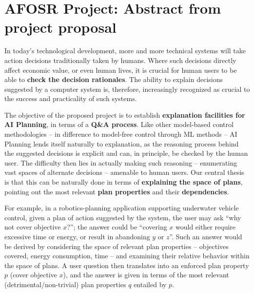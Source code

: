 
\section{AFOSR Project: Abstract from project proposal}
\label{sec:afosr-abstractr}

In today's technological development, more and more technical systems
will take action decisions traditionally taken by humans. Where such
decisions directly affect economic value, or even human lives, it is
crucial for human users to be able to \textbf{check the decision
  rationales}. The ability to explain decisions suggested by a
computer system is, therefore, increasingly recognized as crucial to
the success and practicality of such systems.

The objective of the proposed project is to establish
\textbf{explanation facilities for AI Planning}, in terms of a
\textbf{Q\&A process}. Like other model-based control methodologies --
in difference to model-free control through ML methods -- AI Planning
lends itself naturally to explanation, as the reasoning process behind
the suggested decisions is explicit and can, in principle, be checked
by the human user. The difficulty then lies in actually making such
reasoning -- enumerating vast spaces of alternate decisions --
amenable to human users. Our central thesis is that this can be
naturally done in terms of \textbf{explaining the space of plans},
pointing out the most relevant \textbf{plan properties} and their
\textbf{dependencies}.

For example, in a robotics-planning application supporting underwater
vehicle control, given a plan of action suggested by the system, the
user may ask ``why not cover objective $x$?''; the answer could be
``covering $x$ would either require excessive time or energy, or
result in abandoning $y$ or $z$''.
Such an answer would be derived by considering the space of relevant
plan properties -- objectives covered, energy consumption, time -- and
examining their relative behavior within the space of plans. A user
question then translates into an enforced plan property $p$ (cover
objective $x$), and the answer is given in terms of the most relevant
(detrimental/non-trivial) plan properties $q$ entailed by $p$.


